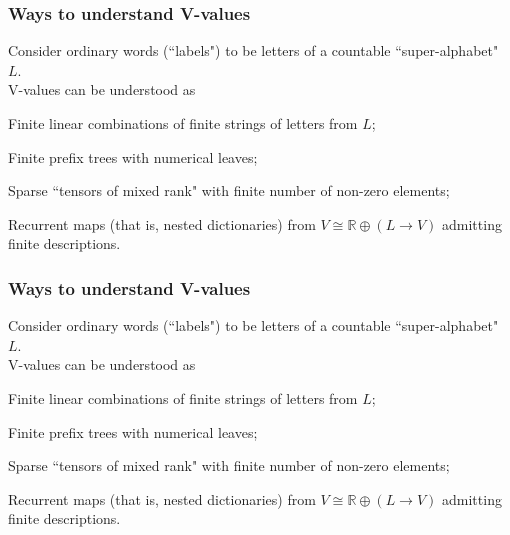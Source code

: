 \documentclass{beamer}
\newcommand{\msgray}[1]{{\color{mygray} #1}}
\begin{document}
\begin{frame}

  \frametitle{Ways to understand V-values}

Consider ordinary words (``labels") to be letters of a countable ``super-alphabet" $L$.\\[2ex]

V-values can be understood as

\begin{itemize}


  \item Finite linear combinations of finite strings of letters from $L$;
\msgray{
  \item Finite prefix trees with numerical leaves;
  \item Sparse ``tensors of mixed rank" with finite number of non-zero elements;
  \item Recurrent maps (that is, nested dictionaries) from $V \cong \mathbb{R}\oplus (L \rightarrow V)$  admitting finite descriptions.
}

\end{itemize}


\end{frame}

\begin{frame}

  \frametitle{Ways to understand V-values}

Consider ordinary words (``labels") to be letters of a countable ``super-alphabet" $L$.\\[2ex]

V-values can be understood as

\begin{itemize}


  \item Finite linear combinations of finite strings of letters from $L$;
  \item Finite prefix trees with numerical leaves;
\msgray{ 
 \item Sparse ``tensors of mixed rank" with finite number of non-zero elements;
  \item Recurrent maps (that is, nested dictionaries) from $V \cong \mathbb{R}\oplus (L \rightarrow V)$  admitting finite descriptions.
}

\end{itemize}


\end{frame}
\end{document}
